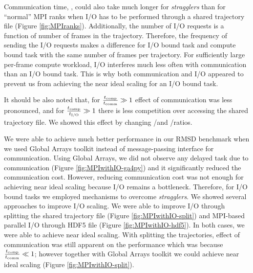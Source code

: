 Communication time, \tcomm, could also take much longer for \emph{stragglers} than for ``normal'' MPI ranks when I/O has to be performed through a shared trajectory file (Figure \ref{fig:MPIranks}). 
Additionally, the number of I/O requests is a function of number of frames in the trajectory. 
Therefore, the frequency of sending the I/O requests makes a difference for I/O bound task and compute bound task with the same number of frames per trajectory.
For sufficiently large per-frame compute workload, I/O interferes much less often with communication than an I/O bound task.
This is why both communication and I/O appeared to prevent us from achieving the near ideal scaling for an I/O bound task.

It should be also noted that, for $\frac{{t}_{\text{comp}}}{t_{\text{comm}}} \gg 1$ effect of communication was less pronounced, and for $\frac{{t}_{\text{comp}}}{{t}_{\text{I/O}}} \gg 1$ there is less competition over accessing the shared trajectory file.
We showed this effect by changing \tcomp/\tIO and \tcomp/\tcomm ratios.

We were able to achieve much better performance in our RMSD benchmark when we used Global Arrays toolkit instead of message-passing interface for communication. 
Using Global Arrays, we did not observe any delayed task due to communication (Figure \ref{fig:MPIwithIO-ga4py}) and it significantly reduced the communication cost. 
However, reducing communication cost was not enough for achieving near ideal scaling because I/O remains a bottleneck.
Therefore, for I/O bound tasks we employed mechanisms to overcome \emph{stragglers}. 
We showed several approaches to improve I/O scaling.
We were able to improve I/O through splitting the shared trajectory file (Figure \ref{fig:MPIwithIO-split}) and MPI-based parallel I/O through HDF5 file (Figure \ref{fig:MPIwithIO-hdf5}). 
In both cases, we were able to achieve near ideal scaling.
With splitting the trajectories, effect of communication was still apparent on the performance which was because $\frac{{t}_{\text{comp}}}{t_{\text{comm}}} \ll 1$; however together with 
Global Arrays toolkit we could achieve near ideal scaling (Figure \ref{fig:MPIwithIO-split}).

